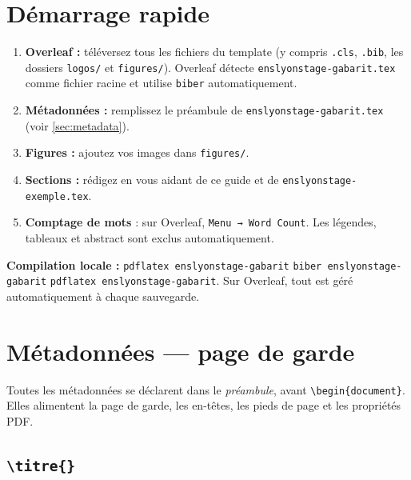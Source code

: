 \documentclass[12pt, a4paper]{article}
\begin{document}
\section{Démarrage rapide}

\begin{enumerate}
  \item \textbf{Overleaf :} téléversez tous les fichiers du template
    (y compris \texttt{.cls}, \texttt{.bib}, les dossiers \texttt{logos/}
    et \texttt{figures/}). Overleaf détecte \texttt{enslyonstage-gabarit.tex} comme fichier
    racine et utilise \texttt{biber} automatiquement.
  \item \textbf{Métadonnées :} remplissez le préambule de
    \texttt{enslyonstage-gabarit.tex} (voir \autoref{sec:metadata}).
  \item \textbf{Figures :} ajoutez vos images dans \texttt{figures/}.
  \item \textbf{Sections :} rédigez en vous aidant de ce guide
    et de \texttt{enslyonstage-exemple.tex}.
  \item \textbf{Comptage de mots} : sur Overleaf, \texttt{Menu → Word Count}.
    Les légendes, tableaux et abstract sont exclus automatiquement.
\end{enumerate}

\begin{astuce}
  \textbf{Compilation locale :}
  \texttt{pdflatex enslyonstage-gabarit} \textrightarrow{}
  \texttt{biber enslyonstage-gabarit} \textrightarrow{}
  \texttt{pdflatex enslyonstage-gabarit}.
  Sur Overleaf, tout est géré automatiquement à chaque sauvegarde.
\end{astuce}

\section{Métadonnées — page de garde}
\label{sec:metadata}

Toutes les métadonnées se déclarent dans le \emph{préambule}, avant
\verb|\begin{document}|. Elles alimentent la page de garde, les en-têtes,
les pieds de page et les propriétés PDF.

\subsection{\texttt{\textbackslash titre\{\}}}
\end{document}
